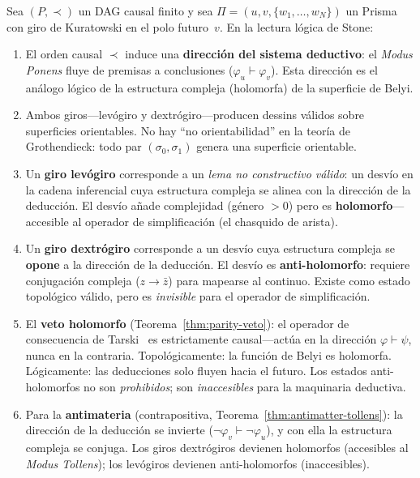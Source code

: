 \documentclass[11pt, a4paper, openany]{book}
\begin{document}
\begin{theorem}
\label{thm:parity-stone}
Sea $(P, \prec)$ un DAG causal finito y sea $\Pi = (u, v,
\{w_1, \ldots, w_N\})$ un Prisma con giro de Kuratowski en el polo
futuro~$v$. En la lectura l\'ogica de Stone:
\begin{enumerate}
  \item El orden causal $\prec$ induce una \textbf{direcci\'on
    del sistema deductivo}: el \emph{Modus Ponens} fluye de premisas
    a conclusiones ($\varphi_u \vdash \varphi_v$). Esta direcci\'on
    es el an\'alogo l\'ogico de la estructura compleja (holomorfa)
    de la superficie de Belyi.
  \item Ambos giros---lev\'ogiro y dextr\'ogiro---producen dessins
    v\'alidos sobre superficies orientables. No hay ``no orientabilidad''
    en la teor\'ia de Grothendieck: todo par $(\sigma_0, \sigma_1)$
    genera una superficie orientable.
  \item Un \textbf{giro lev\'ogiro} corresponde a un
    \emph{lema no constructivo v\'alido}: un desv\'io en la cadena
    inferencial cuya estructura compleja se alinea con la direcci\'on
    de la deducci\'on. El desv\'io a\~nade complejidad (g\'enero $> 0$)
    pero es \textbf{holomorfo}---accesible al operador de
    simplificaci\'on (el chasquido de arista).
  \item Un \textbf{giro dextr\'ogiro} corresponde a un desv\'io cuya
    estructura compleja se \textbf{opone} a la direcci\'on de la
    deducci\'on. El desv\'io es \textbf{anti-holomorfo}: requiere
    conjugaci\'on compleja ($z \to \bar{z}$) para mapearse al
    continuo. Existe como estado topol\'ogico v\'alido, pero
    es \emph{invisible} para el operador de simplificaci\'on.
  \item El \textbf{veto holomorfo}
    (Teorema~\ref{thm:parity-veto}): el operador de consecuencia
    de Tarski~\cite{tarski1930} es estrictamente causal---act\'ua
    en la direcci\'on $\varphi \vdash \psi$, nunca en la contraria.
    Topol\'ogicamente: la funci\'on de Belyi es holomorfa.
    L\'ogicamente: las deducciones solo fluyen hacia el futuro.
    Los estados anti-holomorfos no son \emph{prohibidos}; son
    \emph{inaccesibles} para la maquinaria deductiva.
  \item Para la \textbf{antimateria} (contrapositiva,
    Teorema~\ref{thm:antimatter-tollens}): la direcci\'on de la
    deducci\'on se invierte ($\neg\varphi_v \vdash \neg\varphi_u$),
    y con ella la estructura compleja se conjuga. Los giros
    dextr\'ogiros devienen holomorfos (accesibles al \emph{Modus
    Tollens}); los lev\'ogiros devienen anti-holomorfos (inaccesibles).
\end{enumerate}
\end{theorem}
\end{document}

